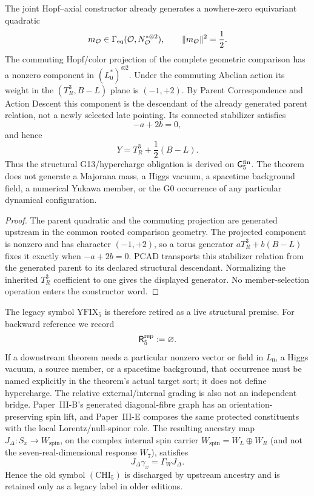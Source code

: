 \documentclass[12pt,a4paper]{article}
\begin{document}
\begin{definition}
\begin{proposition}
\label{p5:prop:v187-pcad-yfix}
The joint Hopf--axial constructor already generates a nowhere-zero equivariant
quadratic
\[
 m_{\mathcal O}\in
 \Gamma_{\rm eq}(\mathcal O,N_{\mathcal O}^{*\otimes2}),
 \qquad \|m_{\mathcal O}\|^2=\frac12.
\]
The commuting Hopf/color projection of the complete geometric comparison has
a nonzero component in \((L_0^*)^{\otimes2}\).  Under the commuting Abelian
action its weight in the \((T_R^3,B-L)\) plane is \((-1,+2)\).  By Parent
Correspondence and Action Descent this component is the descendant of the
already generated parent relation, not a newly selected late pointing.  Its
connected stabilizer satisfies
\[
 -a+2b=0,
\]
and hence
\[
 \boxed{Y=T_R^3+\frac12(B-L).}
\]
Thus the structural G13/hypercharge obligation is derived on
\(\mathsf G_5^{\rm fin}\).  The theorem does not generate a Majorana mass, a
Higgs vacuum, a spacetime background field, a numerical Yukawa member, or the
G0 occurrence of any particular dynamical configuration.
\end{proposition}
\begin{proof}
The parent quadratic and the commuting projection are generated upstream in
the common rooted comparison geometry.  The projected component is nonzero
and has character \((-1,+2)\), so a torus generator
\(aT_R^3+b(B-L)\) fixes it exactly when \(-a+2b=0\).  PCAD transports this
stabilizer relation from the generated parent to its declared structural
descendant.  Normalizing the inherited \(T_R^3\) coefficient to one gives the
displayed generator.  No member-selection operation enters the constructor
word.
\end{proof}

The legacy symbol \(\mathrm{YFIX}_5\) is therefore retired as a live
structural premise.  For backward reference we record
\begin{equation}
\label{p5:eq:yfix5}
 \mathsf R_5^{\rm rep}:=\varnothing.
\end{equation}
If a downstream theorem needs a particular nonzero vector or field in
\(L_0\), a Higgs vacuum, a source member, or a spacetime background, that
occurrence must be named explicitly in the theorem's actual target sort; it
does not define hypercharge.  The relative external/internal grading is also
not an independent bridge.  Paper~III-B's generated diagonal-fibre graph has
an orientation-preserving spin lift, and Paper~III-E composes the same
protected constituents with the local Lorentz/null-spinor role.  The
resulting ancestry map \(J_\Delta:S_x\to W_{\mathrm{spin}}\), on the
complex internal spin carrier $W_{\mathrm{spin}}=W_L\oplus W_R$
(and not the seven-real-dimensional response $W_7$), satisfies
\begin{equation}
\label{p5:eq:chi5-derived}
 J_\Delta\gamma_x=\Gamma_WJ_\Delta.
\end{equation}
Hence the old symbol \((\mathrm{CHI}_5)\) is discharged by upstream ancestry
and is retained only as a legacy label in older editions.


\end{definition}
\end{document}
